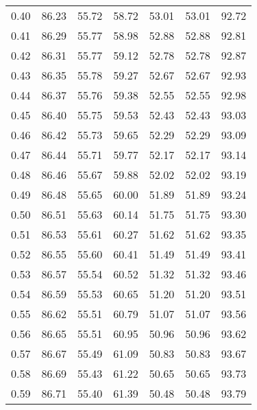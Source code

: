 \begin{tabular}{|c|c|c|c|c|c|c|}
      0.40 &     86.23 &     55.72 &      58.72 &   53.01 &      53.01 &         92.72 \\
      0.41 &     86.29 &     55.77 &      58.98 &   52.88 &      52.88 &         92.81 \\
      0.42 &     86.31 &     55.77 &      59.12 &   52.78 &      52.78 &         92.87 \\
      0.43 &     86.35 &     55.78 &      59.27 &   52.67 &      52.67 &         92.93 \\
      0.44 &     86.37 &     55.76 &      59.38 &   52.55 &      52.55 &         92.98 \\
      0.45 &     86.40 &     55.75 &      59.53 &   52.43 &      52.43 &         93.03 \\
      0.46 &     86.42 &     55.73 &      59.65 &   52.29 &      52.29 &         93.09 \\
      0.47 &     86.44 &     55.71 &      59.77 &   52.17 &      52.17 &         93.14 \\
      0.48 &     86.46 &     55.67 &      59.88 &   52.02 &      52.02 &         93.19 \\
      0.49 &     86.48 &     55.65 &      60.00 &   51.89 &      51.89 &         93.24 \\
      0.50 &     86.51 &     55.63 &      60.14 &   51.75 &      51.75 &         93.30 \\
      0.51 &     86.53 &     55.61 &      60.27 &   51.62 &      51.62 &         93.35 \\
      0.52 &     86.55 &     55.60 &      60.41 &   51.49 &      51.49 &         93.41 \\
      0.53 &     86.57 &     55.54 &      60.52 &   51.32 &      51.32 &         93.46 \\
      0.54 &     86.59 &     55.53 &      60.65 &   51.20 &      51.20 &         93.51 \\
      0.55 &     86.62 &     55.51 &      60.79 &   51.07 &      51.07 &         93.56 \\
      0.56 &     86.65 &     55.51 &      60.95 &   50.96 &      50.96 &         93.62 \\
      0.57 &     86.67 &     55.49 &      61.09 &   50.83 &      50.83 &         93.67 \\
      0.58 &     86.69 &     55.43 &      61.22 &   50.65 &      50.65 &         93.73 \\
      0.59 &     86.71 &     55.40 &      61.39 &   50.48 &      50.48 &         93.79 \\

\end{tabular}
